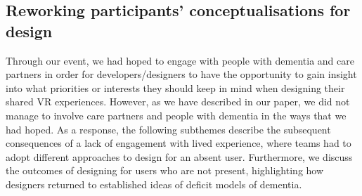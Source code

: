 \subsection{Reworking participants' conceptualisations for design}
\label{LearningEvent:ThemeTwo}
Through our event, we had hoped to engage with people with dementia and care partners in order for developers/designers to have the opportunity to gain insight into what priorities or interests they should keep in mind when designing their shared VR experiences. However, as we have described in our paper, we did not manage to involve care partners and people with dementia in the ways that we had hoped. As a response, the following subthemes describe the subsequent consequences of a lack of engagement with lived experience, where teams had to adopt different approaches to design for an absent user. Furthermore, we discuss the outcomes of designing for users who are not present, highlighting how designers returned to established ideas of deficit models of dementia. 

